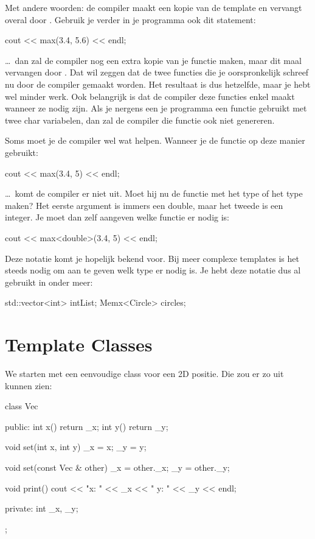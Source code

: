 \documentclass[11pt, oldfontcommands, oneside, a4paper]{memoir}
\begin{document}
Met andere woorden: de compiler maakt een kopie van de template en vervangt  overal door . Gebruik je verder in je programma ook dit statement:

\begin{code}
cout << max(3.4, 5.6) << endl;
\end{code}

\ldots\ dan zal de compiler nog een extra kopie van je functie maken, maar dit maal  vervangen door . Dat wil zeggen dat de twee functies die je oorspronkelijk schreef nu door de compiler gemaakt worden. Het resultaat is dus hetzelfde, maar je hebt wel minder werk. Ook belangrijk is dat de compiler deze functies enkel maakt wanneer ze nodig zijn. Als je nergens een je programma een functie  gebruikt met twee char variabelen, dan zal de compiler die functie ook niet genereren.

Soms moet je de compiler wel wat helpen. Wanneer je de functie op deze manier gebruikt:

\begin{code}
cout << max(3.4, 5) << endl;
\end{code}

\ldots\ komt de compiler er niet uit. Moet hij nu de functie met het type  of het type  maken? Het eerste argument is immers een double, maar het tweede is een integer. Je moet dan zelf aangeven welke functie er nodig is:

\begin{code}
cout << max<double>(3.4, 5) << endl;
\end{code}

Deze notatie komt je hopelijk bekend voor. Bij meer complexe templates is het steeds nodig om aan te geven welk type er nodig is. Je hebt deze notatie dus al gebruikt in onder meer:

\begin{code}
std::vector<int> intList;
Memx<Circle> circles;
\end{code}

\chapter{Template Classes}
We starten met een eenvoudige class voor een 2D positie. Die zou er zo uit kunnen zien:

\begin{code}
class Vec {
public:
  int x() { return _x; }
  int y() { return _y; }

  void set(int x, int y) {
  	_x = x;
  	_y = y;
  }

  void set(const Vec & other) {
  	_x = other._x;
  	_y = other._y;
  }

  void print() {
  	cout << "x: " << _x << " y: " << _y << endl;
  }

private:
  int _x, _y;
};
\end{code}
\end{document}
